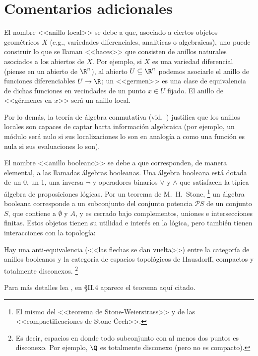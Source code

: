\documentclass[11pt, reqno]{amsart}
\begin{document}
\section{Comentarios adicionales}
El nombre <<anillo local>> se debe a que, asociado a ciertos objetos geométricos $X$ (e.g., variedades diferenciales,
analíticas o algebraicas), uno puede construir lo que se llaman <<haces>> que consisten de anillos naturales asociados a
los abiertos de $X$.
Por ejemplo, si $X$ es una variedad diferencial (piense en un abierto de $\R^n$), al abierto $U \subseteq \R^n$ podemos
asociarle el anillo de funciones diferenciables $U \to \R$; un <<germen>> es una clase de equivalencia de dichas
funciones en vecindades de un punto $x \in U$ fijado.
El anillo de <<gérmenes en $x$>> será un anillo local.

Por lo demás, la teoría de álgebra conmutativa (vid.\ \cite{atiyah:commutative}) justifica que los anillos locales son
capaces de captar harta información algebraica (por ejemplo, un módulo será nulo si sus localizaciones lo son en
analogía a como una función es nula si sus evaluaciones lo son).

El nombre <<anillo booleano>> se debe a que corresponden, de manera elemental, a las llamadas álgebras booleanas.
Una álgebra booleana está dotada de un 0, un 1, una inversa $\neg$ y operadores binarios $\vee$ y $\wedge$ que
satisfacen la típica álgebra de proposiciones lógicas.
Por un teorema de M.~H.~Stone,%
\footnote{El mismo del <<teorema de Stone-Weierstrass>> y de las <<compactificaciones de Stone-\v Cech>>.}
un álgebra booleana corresponde a un subconjunto del conjunto potencia $\mathcal{P} S$ de un conjunto $S$, que contiene
a $\emptyset$ y $A$, y es cerrado bajo complementos, uniones e intersecciones finitas.
Estos objetos tienen su utilidad e interés en la lógica, pero también tienen interacciones con la topología:
\begin{thm}
	Hay una anti-equivalencia (<<las flechas se dan vuelta>>) entre la categoría de anillos booleanos y la categoría
	de espacios topológicos de Hausdorff, compactos y totalmente disconexos.%
	\footnote{Es decir, espacios en donde todo subconjunto con al menos dos puntos es disconexo. Por ejemplo, $\Q$
	es totalmente disconexo (pero no es compacto).}
\end{thm}
Para más detalles lea \cite{johnstone:stone}, en \S II.4 aparece el teorema aquí citado.

\printbibliography
\end{document}

